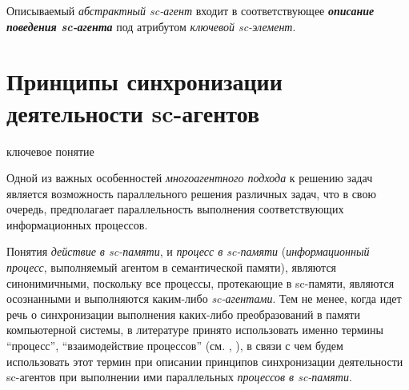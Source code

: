 Описываемый \textit{абстрактный sc-агент} входит в соответствующее \textbf{\textit{описание поведения sc-агента}} под атрибутом \textit{ключевой sc-элемент\scnrolesign}.

\section{Принципы синхронизации деятельности sc-агентов}
\label{sec_ps_sync}

\begin{SCn}
\begin{scnrelfromlist}{ключевое понятие}
\end{scnrelfromlist}
\end{SCn}

Одной из важных особенностей \textit{многоагентного подхода} к решению задач является возможность параллельного решения различных задач, что в свою очередь, предполагает параллельность выполнения соответствующих информационных процессов.

Понятия \textit{действие в sc-памяти}, и \textit{процесс в sc-памяти} (\textit{информационный процесс}, выполняемый агентом в семантической памяти), являются синонимичными, поскольку все процессы, протекающие в sc-памяти, являются осознанными и выполняются каким-либо \textit{sc-агентами}. Тем не менее, когда идет речь о синхронизации выполнения каких-либо преобразований в памяти компьютерной системы, в литературе принято использовать именно термины ``процесс'', ``взаимодействие процессов'' (см. , ), в связи с чем будем использовать этот термин при описании принципов синхронизации деятельности sc-агентов при выполнении ими параллельных \textit{процессов в sc-памяти}.


